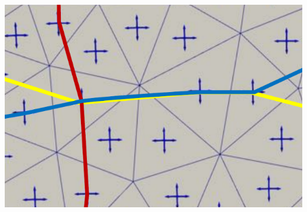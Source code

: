 \documentclass[a0paper,portrait, fontscale=0.30]{baposter}
\begin{document}
\begin{poster}
{\begin{minipage}[b]{0.35\linewidth}
\end{minipage}
\hspace{0.09\linewidth}
\begin{minipage}[b]{0.35\linewidth}
\includegraphics[width=0.99\linewidth]{incomp_edges}
\end{minipage}
%
%	
}
\end{poster}
\end{document}
